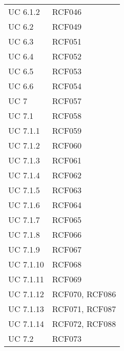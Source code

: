 \begin{longtabu} {X[c] X[c]}
   {UC 6.1.2} & RCF046 \\ 
   
   {UC 6.2} & RCF049 \\ 
   
   {UC 6.3} & RCF051 \\
   
   {UC 6.4} & RCF052 \\ 
   
   {UC 6.5} & RCF053 \\ 
   
   {UC 6.6} & RCF054 \\ 
   
   
   
   {UC 7} & RCF057 \\ 
   
   {UC 7.1} & RCF058 \\ 
   
   {UC 7.1.1} & RCF059 \\ 
   
   {UC 7.1.2} & RCF060 \\ 
   
   {UC 7.1.3} & RCF061 \\ 
   
   {UC 7.1.4} & RCF062 \\ 
   
   {UC 7.1.5} & RCF063 \\  
   
   {UC 7.1.6} & RCF064 \\ 
   
   {UC 7.1.7} & RCF065 \\ 
   
   {UC 7.1.8} & RCF066 \\  
   
   {UC 7.1.9} & RCF067 \\ 
   
   {UC 7.1.10} & RCF068 \\ 
   
   {UC 7.1.11} & RCF069 \\ 
   
   {UC 7.1.12} & RCF070, RCF086\\ 
   
   {UC 7.1.13} & RCF071, RCF087 \\ 
   
   {UC 7.1.14} & RCF072, RCF088 \\ 
   
   {UC 7.2} & RCF073 \\ 
   

\end{longtabu}
